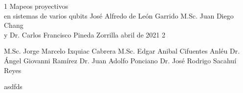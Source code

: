 \documentclass[letterpaper,12pt]{thesisECFM}
\theoremstyle{plain}
\theoremstyle{definition}
\theoremstyle{remark}
\newcommand{\1}{\mathbb{1}}
\begin{document}
\datosThesis%
{1}%
{Mapeos proyectivos\\en sistemas de varios qubits}%
{José Alfredo de León Garrido}%
{M.Sc. Juan Diego Chang\\y Dr. Carlos Francisco
Pineda Zorrilla}%
{abril de 2021}		%
{2}							%

\examenPrivado%
{M.Sc. Jorge Marcelo Ixquiac Cabrera}%
{M.Sc. Edgar Anibal Cifuentes Anléu}%
{Dr. Ángel Giovanni Ramírez}%
{Dr. Juan Adolfo Ponciano}%
{Dr. José Rodrigo Sacahuí Reyes}%

{\onehalfspacing	%



asdfds
\par}
 
\frontmatter    %

{\onehalfspacing	%

\tableofcontents    %





\mainmatter     %





{\backmatter     %




}


%

\par}               %
\end{document}
